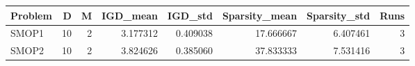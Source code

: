 \begin{tabular}{lrrrrrrr}
\toprule
Problem & D & M & IGD_mean & IGD_std & Sparsity_mean & Sparsity_std & Runs \\
\midrule
SMOP1 & 10 & 2 & 3.177312 & 0.409038 & 17.666667 & 6.407461 & 3 \\
SMOP2 & 10 & 2 & 3.824626 & 0.385060 & 37.833333 & 7.531416 & 3 \\
\bottomrule
\end{tabular}
